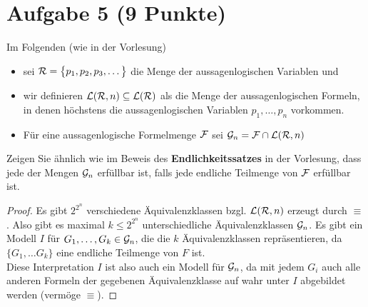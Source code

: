 \section*{Aufgabe 5 (9 Punkte)}
Im Folgenden (wie in der Vorlesung)
\begin{itemize}
\item sei $\mathcal{R}=\big\lbrace p_1,p_2,p_3,\ldots\big\rbrace$ die Menge der aussagenlogischen Variablen und
\item wir definieren $\mathcal{L}(\mathcal{R},n)\subseteq\mathcal{L}(\mathcal{R})$ als die Menge der aussagenlogischen Formeln, in denen höchstens die aussagenlogischen Variablen $p_1,\ldots,p_n$ vorkommen.
\item Für eine aussagenlogische Formelmenge $\mathcal{F}$ sei $\mathcal{G}_n=\mathcal{F}\cap\mathcal{L}(\mathcal{R},n)$
\end{itemize}
Zeigen Sie ähnlich wie im Beweis des \textbf{Endlichkeitssatzes} in der Vorlesung, dass jede der Mengen $\mathcal{G}_n$ erfüllbar ist, falls jede endliche Teilmenge von $\mathcal{F}$ erfüllbar ist.

\begin{proof}

Es gibt $2^{2^n}$ verschiedene Äquivalenzklassen bzgl. $\mathcal{L}(\mathcal{R},n)$ erzeugt durch $\equiv$. Also gibt es maximal $k\leq2^{2^n}$ unterschiedliche Äquivalenzklassen $\mathcal{G}_n$.
Es gibt ein Modell $I$ für $G_1,\ldots,G_k\in\mathcal{G}_n$, die die $k$ Äquivalenzklassen repräsentieren, da $\lbrace G_1,\ldots G_k\rbrace$ eine endliche Teilmenge von $F$ ist.\\
Diese Interpretation $I$ ist also auch ein Modell für $\mathcal{G}_n$, da mit jedem $G_i$ auch alle anderen Formeln der gegebenen Äquivalenzklasse auf wahr unter $I$ abgebildet werden (vermöge $\equiv$).
\end{proof}
